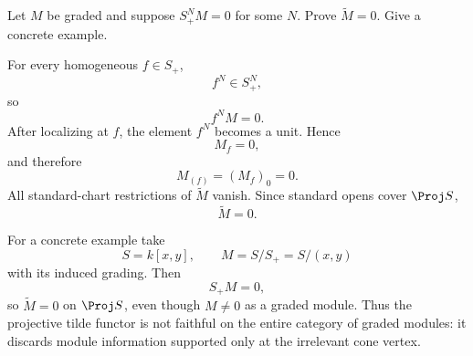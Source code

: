 \begin{problem}\label{prob:vi35-15}
Let \(M\) be graded and suppose \(S_+^NM=0\) for some \(N\). Prove \(\widetilde M=0\). Give a concrete example.

\end{problem}

\ifdefined\FullProblemDossiers
\begin{solution}
For every homogeneous \(f\in S_+\),
\[
f^N\in S_+^N,
\]
so
\[
f^NM=0.
\]
After localizing at \(f\), the element \(f^N\) becomes a unit. Hence
\[
M_f=0,
\]
and therefore
\[
M_{(f)}=(M_f)_0=0.
\]
All standard-chart restrictions of \(\widetilde M\) vanish. Since standard opens cover \(\Proj S\),
\[
\boxed{\widetilde M=0}.
\]

For a concrete example take
\[
S=k[x,y],
\qquad
M=S/S_+=S/(x,y)
\]
with its induced grading. Then
\[
S_+M=0,
\]
so \(\widetilde M=0\) on \(\Proj S\), even though \(M\neq0\) as a graded module. Thus the projective tilde functor is
not faithful on the entire category of graded modules: it discards module information supported only at the
irrelevant cone vertex.
\end{solution}
\fi
